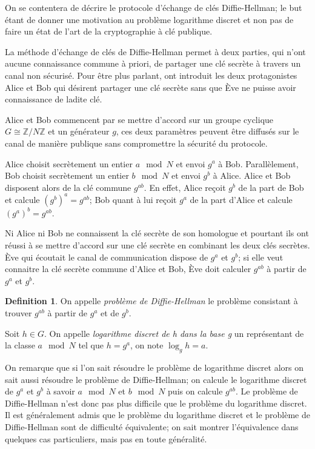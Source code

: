 \documentclass[a4paper]{article}
\theoremstyle{definition}
\newtheorem{definition}{Definition}[section]
\theoremstyle{remark}
\numberwithin{equation}{section}
\begin{document}
On se contentera de décrire le protocole d'échange de clés Diffie-Hellman; le but étant de donner une motivation au problème logarithme discret et non pas de faire un état de l'art de la cryptographie à clé publique.

La méthode d'échange de clés de Diffie-Hellman permet à deux parties, qui n'ont aucune connaissance commune à priori, de partager une clé secrète à travers un canal non sécurisé. Pour être plus parlant, ont introduit les deux protagonistes Alice et Bob qui désirent partager une clé secrète sans que Ève ne puisse avoir connaissance de ladite clé.

Alice et Bob commencent par se mettre d'accord sur un groupe cyclique $G \cong \mathbb{Z}/N\mathbb{Z}$ et un générateur $g$, ces deux paramètres peuvent être diffusés sur le canal de manière publique sans compromettre la sécurité du protocole.

Alice choisit secrètement un entier $a \mod N$ et envoi $g^a$ à Bob. Parallèlement, Bob choisit secrètement un entier $b \mod N$ et envoi $g^b$ à Alice. Alice et Bob disposent alors de la clé commune $g^{ab}$. En effet, Alice reçoit $g^b$ de la part de Bob et calcule $(g^b)^a = g^{ab}$; Bob quant à lui reçoit $g^a$ de la part d'Alice et calcule $(g^a)^b = g^{ab}$.

Ni Alice ni Bob ne connaissent la clé secrète de son homologue et pourtant ils ont réussi à se mettre d'accord sur une clé secrète en combinant les deux clés secrètes. Ève qui écoutait le canal de communication dispose de $g^a$ et $g^b$; si elle veut connaitre la clé secrète commune d'Alice et Bob, Ève doit calculer $g^{ab}$ à partir de $g^a$ et $g^b$.

\begin{definition}
On appelle \emph{problème de Diffie-Hellman} le problème consistant à trouver $g^{ab}$ à partir de $g^a$ et de $g^b$.

Soit $h \in G$. On appelle \emph{logarithme discret de h dans la base g} un représentant de la classe $a \mod N$ tel que $h=g^a$, on note $\log_g h = a$.
\end{definition}

On remarque que si l'on sait résoudre le problème de logarithme discret alors on sait aussi résoudre le problème de Diffie-Hellman; on calcule le logarithme discret de $g^a$ et $g^b$ à savoir $a \mod N$ et $b \mod N$ puis on calcule $g^{ab}$. Le problème de Diffie-Hellman n'est donc pas plus difficile que le problème du logarithme discret. Il est généralement admis que le problème du logarithme discret et le problème de Diffie-Hellman sont de difficulté équivalente; on sait montrer l'équivalence dans quelques cas particuliers, mais pas en toute généralité.
\end{document}
